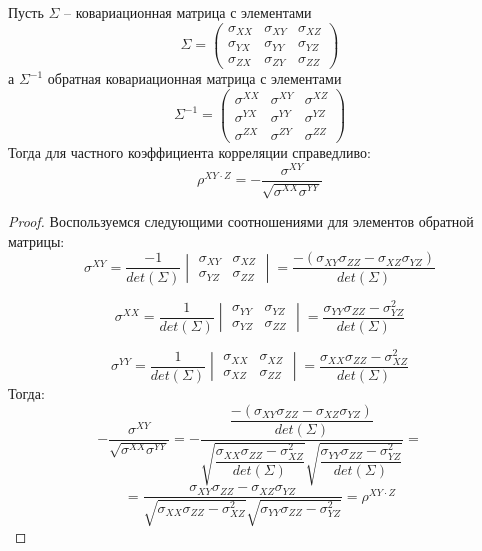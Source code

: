 \begin{lemma}
    Пусть $\Sigma$ -- ковариационная матрица с элементами
    $$\Sigma =
    \begin{pmatrix}
        \sigma_{XX} & \sigma_{XY} & \sigma_{XZ} \\
        \sigma_{YX} & \sigma_{YY} & \sigma_{YZ} \\
        \sigma_{ZX} & \sigma_{ZY} & \sigma_{ZZ}
    \end{pmatrix}
    $$
    а $\Sigma^{-1}$ обратная ковариационная матрица с элементами
    $$\Sigma^{-1} =
    \begin{pmatrix}
        \sigma^{XX} & \sigma^{XY} & \sigma^{XZ} \\
        \sigma^{YX} & \sigma^{YY} & \sigma^{YZ} \\
        \sigma^{ZX} & \sigma^{ZY} & \sigma^{ZZ}
    \end{pmatrix}
    $$
    Тогда для частного коэффициента корреляции справедливо:
    $$
    \rho^{XY \cdot Z}=-\dfrac{\sigma^{XY}}{\sqrt{\sigma^{XX}\sigma^{YY}}}
    $$
\end{lemma}
\begin{proof}
    Воспользуемся следующими соотношениями для элементов обратной матрицы:
    $$
    \sigma^{XY}=\dfrac{-1}{det(\Sigma)}\begin{vmatrix}
    \sigma_{XY} & \sigma_{XZ}\\
    \sigma_{YZ} & \sigma_{ZZ}
    \end{vmatrix}=\dfrac{-(\sigma_{XY}\sigma_{ZZ}-\sigma_{XZ}\sigma_{YZ})}{det(\Sigma)}
    $$

    $$
    \sigma^{XX}=\dfrac{1}{det(\Sigma)}\begin{vmatrix}
    \sigma_{YY} & \sigma_{YZ}\\
    \sigma_{YZ} & \sigma_{ZZ}
    \end{vmatrix}
    = \dfrac{\sigma_{YY}\sigma_{ZZ}-\sigma_{YZ}^2}{det(\Sigma)}
    $$

    $$
    \sigma^{YY}=\dfrac{1}{det(\Sigma)}\begin{vmatrix}
    \sigma_{XX} & \sigma_{XZ}\\
    \sigma_{XZ} & \sigma_{ZZ}
    \end{vmatrix}
    = \dfrac{\sigma_{XX}\sigma_{ZZ}-\sigma_{XZ}^2}{det(\Sigma)}
    $$
    Тогда:
    $$
    -\dfrac{\sigma^{XY}}{\sqrt{\sigma^{XX}\sigma^{YY}}}=-\dfrac{
        \dfrac{-(\sigma_{XY}\sigma_{ZZ}-\sigma_{XZ}\sigma_{YZ})}{det(\Sigma)}
    }{
        \sqrt{\dfrac{\sigma_{XX}\sigma_{ZZ}-\sigma_{XZ}^2}{det(\Sigma)}}
        \sqrt{\dfrac{\sigma_{YY}\sigma_{ZZ}-\sigma_{YZ}^2}{det(\Sigma)}}
    }=
    $$
    $$
    = \dfrac{\sigma_{XY}\sigma_{ZZ}-\sigma_{XZ}\sigma_{YZ}}{
        \sqrt{\sigma_{XX}\sigma_{ZZ}-\sigma_{XZ}^2}
        \sqrt{\sigma_{YY}\sigma_{ZZ}-\sigma_{YZ}^2}
    }=\rho^{XY \cdot Z}
    $$
\end{proof}